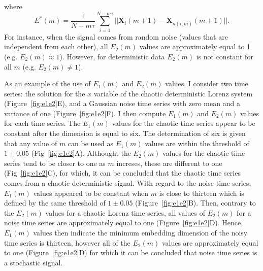 where
\begin{equation}\label{eq:ee}
E^*(m) = \frac{1}{N-m\tau} \sum_{i=1}^{N-m\tau}
|| \boldsymbol{X}_i(m+1) - \boldsymbol{X}_{n(i,m)}(m+1) ||.
\end{equation}
For instance, when the signal comes from random noise (values that are 
independent from each other), all $E_2(m)$ values are approximately equal 
to 1 (e.g. $E_2(m) \approx 1$). However, for deterministic data $E_2(m)$ is 
not constant for all $m$ (e.g. $E_2(m) \neq 1$).

As an example of the use of $E_1(m)$ and $E_2(m)$ values, I consider two time 
series: the solution for the $x$ variable  of the chaotic deterministic Lorenz 
system (Figure~\ref{fig:e1e2}E), and a Gaussian noise time series with 
zero mean and a variance of one (Figure~\ref{fig:e1e2}F).
I then compute $E_1(m)$ and $E_2(m)$ values for each time series.
The $E_1(m)$ values for the chaotic time series appear to be constant
after the dimension is equal to six. The determination of six is 
given that any value of $m$ can be used as $E_1(m)$ values are within 
the threshold of $1\pm0.05$ (Fig~\ref{fig:e1e2}A). 
Althought the $E_2(m)$ values for the chaotic time series tend to be closer to
one as $m$ increses, these are different to one (Fig~\ref{fig:e1e2}C), 
for which, it can be concluded that the chaotic time series comes 
from a chaotic deterministic signal.
With regard to the noise time series,  $E_1(m)$ values appeared to be constant
when $m$ is close to thirteen which is defined by the same threshold of 
$1\pm0.05$ (Figure~\ref{fig:e1e2}B). 
Then, contrary to the $E_2(m)$ values for a chaotic 
Lorenz time series, all values of $E_2(m)$ for a noise time series are 
approximately equal to one (Figure~\ref{fig:e1e2}D). 
Hence, $E_1(m)$ values then indicate the minimum 
embedding dimension of the noisy time series is thirteen, however all of 
the $E_2(m)$ values are approximately equal to one (Figure~\ref{fig:e1e2}D)
for which it can be concluded that noise time series is a stochastic signal.
